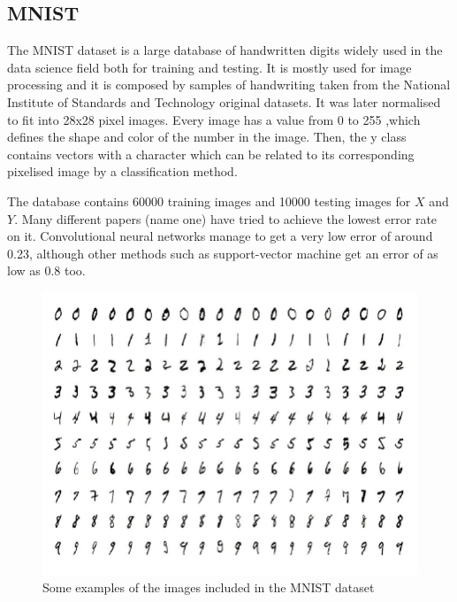 \documentclass[12pt]{report}
\begin{document}
\subsection{MNIST}

The MNIST dataset is a large database of handwritten digits widely used in the data science field both for training and testing. It is mostly used for image processing and it is composed by samples of handwriting taken from the National Institute of Standards and Technology original datasets. It was later normalised to fit into 28x28 pixel images. Every image has a value from 0 to 255 ,which defines the shape and color of the number in the image. Then, the y class contains vectors with a character which can be related to its corresponding pixelised image by a classification method. \par

The database contains 60000 training images and 10000 testing images for $X$ and $Y$. Many different papers (name one) have tried to achieve the lowest error rate on it. Convolutional neural networks manage to get a very low error of around 0.23, although other methods such as support-vector machine get an error of as low as 0.8 too.\par

\begin{figure}[H]
\centering
  \includegraphics[width=16cm]{Figuras_tfg/Figure_MNIST}
  \caption{Some examples of the images included in the MNIST dataset}
 \label{fig:figure_MNIST}
\end{figure}
\end{document}
